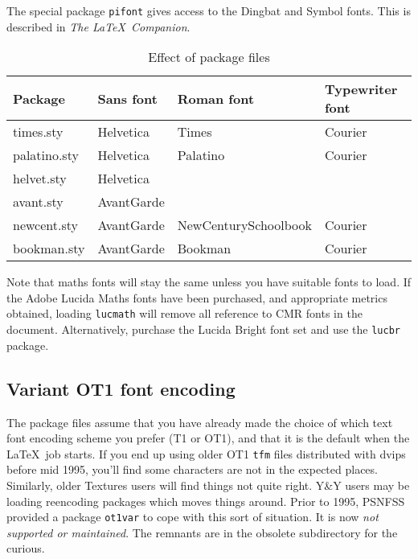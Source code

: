 \documentclass{article}
\begin{document}
The special package \texttt{pifont} gives access to the Dingbat
and Symbol fonts. This is described in \emph{The \LaTeX\ Companion}.
\begin{table}
\begin{small}
  \begin{tabular}{|l|lll|}
\hline
Package & Sans font & Roman font & Typewriter font\\
\hline
times.sty & Helvetica & Times & Courier\\
palatino.sty & Helvetica & Palatino & Courier\\
helvet.sty   & Helvetica & &\\
avant.sty   & AvantGarde & &\\
newcent.sty & AvantGarde & NewCenturySchoolbook & Courier\\
bookman.sty &  AvantGarde & Bookman & Courier\\
\hline
\end{tabular}
\end{small}
\caption{Effect of package files\label{styles}}
\end{table}
Note that maths fonts will stay the same unless you have suitable
fonts to load. If the Adobe Lucida Maths fonts have been purchased, and
appropriate metrics obtained, loading \texttt{lucmath} will remove
all reference to CMR fonts in the document. Alternatively, purchase
the Lucida Bright font set and use the \texttt{lucbr} package.

\subsection{Variant OT1 font encoding}
The package files assume that you have already made the choice of
which text font encoding scheme you prefer (T1 or OT1), and that it is
the default when the \LaTeX\ job starts. If you end up using
older OT1 \verb+tfm+ files distributed with dvips before mid 1995,
you'll find some characters are not in the expected places.
Similarly, older Textures users will find things not quite right. Y\&Y
users may be loading reencoding packages which moves things around.
Prior to 1995, PSNFSS provided
a package  \verb+ot1var+ to cope with this sort of situation.
It is now \emph{not supported or maintained}. The remnants are in
the obsolete subdirectory for the curious.
\end{document}
